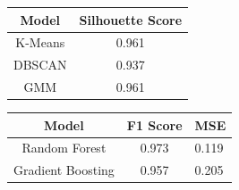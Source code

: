 \documentclass[english]{article}
\begin{document}
\begin{table}
    \begin{minipage}[b]{0.4\textwidth}
        \centering
        \begin{tabular}[b]{|cll|cll|}
            \hline
            \multicolumn{3}{|c|}{Model} & \multicolumn{3}{c|}{Silhouette Score} \\ \hline
            \multicolumn{3}{|c|}{K-Means} & \multicolumn{3}{c|}{0.961} \\ \hline
            \multicolumn{3}{|c|}{DBSCAN} & \multicolumn{3}{c|}{0.937} \\ \hline
            \multicolumn{3}{|c|}{GMM} & \multicolumn{3}{c|}{0.961} \\ \hline
        \end{tabular}
        \label{tbl:clustering}
    \end{minipage}
    \hfill
    \begin{minipage}[b]{0.4\textwidth}
        \centering
        \begin{tabular}[b]{|cll|c|l|}
            \hline
            \multicolumn{3}{|c|}{Model}             & F1 Score & MSE   \\ \hline
            \multicolumn{3}{|c|}{Random Forest}     & 0.973    & 0.119 \\ \hline
            \multicolumn{3}{|c|}{Gradient Boosting} & 0.957    & 0.205 \\ \hline
        \end{tabular}
        \label{tbl:classifiers}
    \end{minipage}

    \vspace{1em} %


\end{table}
\end{document}
